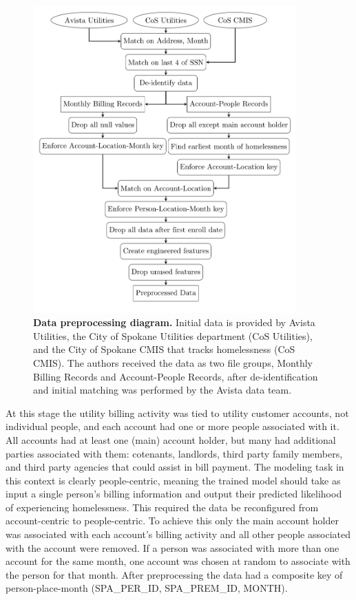 \documentclass[10pt,letterpaper]{article}
\begin{document}
\begin{figure}
    \centering
    \includegraphics[width=0.9\textwidth]{Fig2.png} %
    \caption{{\bf Data preprocessing diagram.} Initial data is provided by Avista Utilities, the City of Spokane Utilities department (CoS Utilities), and the City of Spokane CMIS that tracks homelessness (CoS CMIS). The authors received the data as two file groups, Monthly Billing Records and Account-People Records, after de-identification and initial matching was performed by the Avista data team.}
    \label{fig:preprocessing}
\end{figure}

At this stage the utility billing activity was tied to utility customer accounts, not individual people, and each account had one or more people associated with it. All accounts had at least one (main) account holder, but many had additional parties associated with them: cotenants, landlords, third party family members, and third party agencies that could assist in bill payment. The modeling task in this context is clearly people-centric, meaning the trained model should take as input a single person's billing information and output their predicted likelihood of experiencing homelessness. This required the data be reconfigured from account-centric to people-centric. To achieve this only the main account holder was associated with each account's billing activity and all other people associated with the account were removed. If a person was associated with more than one account for the same month, one account was chosen at random to associate with the person for that month. After preprocessing the data had a composite key of person-place-month (SPA\_PER\_ID, SPA\_PREM\_ID, MONTH).
\end{document}

